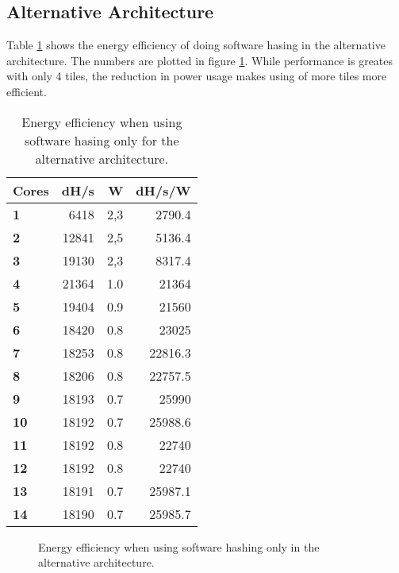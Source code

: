 \begin{appendix}
\subsection{Alternative Architecture}

Table \ref{tab:SW-eff2} shows the energy efficiency of doing software hasing in the alternative architecture. The numbers
are plotted in figure \ref{fig:SW-eff2}. While performance is greates with only 4 tiles, the reduction in power usage
makes using of more tiles more efficient. 

\begin{table}
\centering
\begin{tabular}{| l | r | r || r |}
  \hline 
  \textbf{Cores} & \textbf{dH/s} & \textbf{W} & \textbf{dH/s/W} \\
  \hline                       
  \textbf{1} &  6418 & 2,3 & 2790.4\\
  \textbf{2} &  12841 & 2,5 & 5136.4\\
  \textbf{3} &  19130 & 2,3 & 8317.4\\
  \textbf{4} &  21364 & 1.0 & 21364\\
  \textbf{5} &  19404 & 0.9 & 21560\\
  \textbf{6} &  18420 & 0.8 & 23025\\
  \textbf{7} &  18253 & 0.8 & 22816.3\\
  \textbf{8} &  18206 & 0.8 & 22757.5\\
  \textbf{9} &  18193 & 0.7 & 25990\\
  \textbf{10} &  18192 & 0.7 & 25988.6\\
  \textbf{11} &  18192 & 0.8 & 22740\\
  \textbf{12} &  18192 & 0.8 & 22740\\
  \textbf{13} &  18191 & 0.7 & 25987.1\\
  \textbf{14} &  18190 & 0.7 & 25985.7\\
  \hline 
\end{tabular}
\caption{Energy efficiency when using software hasing only for the alternative architecture.}
\label{tab:SW-eff2}
\end{table}

\begin{figure}
\centering
	\caption{Energy efficiency when using software hashing only in the alternative architecture.}
	\label{fig:SW-eff2}
\end{figure}


\end{appendix}
